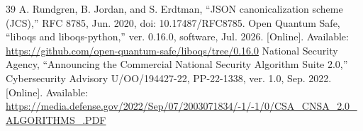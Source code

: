 \begin{thebibliography}{39}
A. Rundgren, B. Jordan, and S. Erdtman, ``JSON canonicalization scheme (JCS),'' RFC 8785, Jun. 2020, doi: 10.17487/RFC8785.
Open Quantum Safe, ``liboqs and liboqs-python,'' ver. 0.16.0, software, Jul. 2026. [Online]. Available: \url{https://github.com/open-quantum-safe/liboqs/tree/0.16.0}
National Security Agency, ``Announcing the Commercial National Security Algorithm Suite 2.0,'' Cybersecurity Advisory U/OO/194427-22, PP-22-1338, ver. 1.0, Sep. 2022. [Online]. Available: \url{https://media.defense.gov/2022/Sep/07/2003071834/-1/-1/0/CSA_CNSA_2.0_ALGORITHMS_.PDF}
\end{thebibliography}
